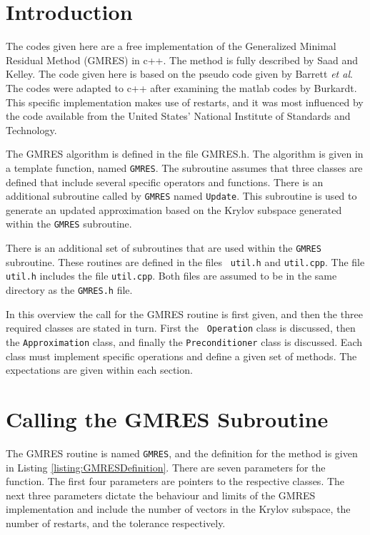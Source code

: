 

\section{Introduction}

The codes given here are a free implementation of the Generalized
Minimal Residual Method (GMRES) in c++. The method is fully described
by Saad\cite{sparseIterative} and Kelley\cite{iterativeMethods}. The
code given here is based on the pseudo code given by Barrett
\textit{et al}\cite{templates}. The codes were adapted to c++ after
examining the matlab codes by Burkardt\cite{BurkardtCode}. This
specific implementation makes use of restarts, and it was most
influenced by the code available from the United States' National
Institute of Standards and Technology\cite{imlCode}.

The GMRES algorithm is defined in the file GMRES.h. The algorithm is
given in a template function, named {\tt GMRES}. The subroutine
assumes that three classes are defined that include several specific
operators and functions. There is an additional subroutine called by
{\tt GMRES} named {\tt Update}. This subroutine is used to generate an
updated approximation based on the Krylov subspace generated within
the {\tt GMRES} subroutine.

There is an additional set of subroutines that are used within the
{\tt GMRES} subroutine. These routines are defined in the files {\tt
  util.h} and {\tt util.cpp}. The file {\tt util.h} includes the file
{\tt util.cpp}. Both files are assumed to be in the same directory as
the {\tt GMRES.h} file.

In this overview the call for the GMRES routine is first given, and
then the three required classes are stated in turn. First the {\tt
  Operation} class is discussed, then the {\tt Approximation} class,
and finally the {\tt Preconditioner} class is discussed. Each class
must implement specific operations and define a given set of
methods. The expectations are given within each section.


\section{Calling the GMRES Subroutine}

The GMRES routine is named {\tt GMRES}, and the definition for the
method is given in Listing \ref{listing:GMRESDefinition}. There are
seven parameters for the function. The first four parameters are
pointers to the respective classes. The next three parameters dictate
the behaviour and limits of the GMRES implementation and include the
number of vectors in the Krylov subspace, the number of restarts, and
the tolerance respectively.


